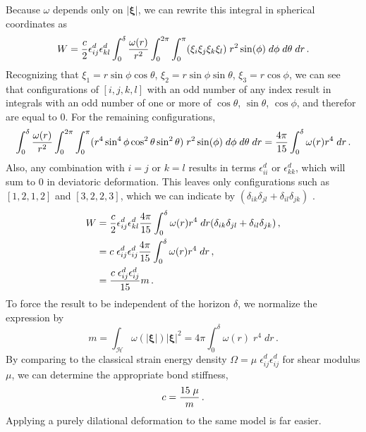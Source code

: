 %
Because $\omega$ depends only on $|\boldsymbol{\xi}|$, we can rewrite this integral in spherical coordinates as
%
\begin{equation}
W= \frac{c}{2}\epsilon_{ij}^d \epsilon_{kl}^d \int_0^\delta \frac{\omega(r)}{r^2}\int_0^{2\pi}\int_0^\pi (\xi_i\xi_j\xi_k\xi_l)\;r^2 \sin(\phi)\;d\phi\;d\theta\;dr\, .\notag
\end{equation}
%
Recognizing that $\xi_1 = r \sin\phi\cos\theta$, $\xi_2=r\sin\phi\sin\theta$, $\xi_3=r\cos\phi$, we can see that configurations of $[i,j,k,l]$ with an odd number of any index result in integrals with an odd number of one or more of $\cos\theta$, $\sin\theta$, $\cos\phi$, and therefor are equal to 0. 
For the remaining configurations,
%
\begin{equation}
\int_0^\delta \frac{\omega(r)}{r^2}\int_0^{2\pi}\int_0^\pi (r^4 \sin^4 \phi \cos^2\theta\sin^2\theta)\;r^2 \sin(\phi)\;d\phi\;d\theta\;dr =  \frac{4\pi}{15} \int_0^\delta \omega(r)r^4\;dr\, .\notag
\end{equation}
%
Also, any combination with $i=j$ or $k=l$ results in terms $\epsilon_{ii}^d$ or  $\epsilon_{kk}^d$, which will sum to 0 in deviatoric deformation. 
This leaves only configurations such as $[1,2,1,2]$ and $[3,2,2,3]$, which we can indicate by $(\delta_{ik}\delta_{jl}+\delta_{il}\delta_{jk})$ .
%
\begin{align}
W&= \frac{c}{2}\epsilon_{ij}^d \epsilon_{kl}^d \frac{4\pi}{15} \int_0^\delta \omega(r)r^4\;dr (\delta_{ik}\delta_{jl}+\delta_{il}\delta_{jk})\, ,\notag\\
&= c \;\epsilon_{ij}^d\epsilon_{ij}^d \frac{4\pi}{15} \int_0^\delta \omega(r)r^4\;dr\, , \notag\\
&= \frac{c\; \epsilon_{ij}^d\epsilon_{ij}^d }{15}m\, .\notag
\end{align}
%
To force the result to be independent of the horizon $\delta$, we normalize the expression by
%
\begin{equation}
\label{eq:weighted}
m=\int_\mathcal{H}\omega(|\boldsymbol{\xi}|)|\boldsymbol{\xi}|^2 = 4\pi \int_0^\delta \omega(r)\;r^4\;dr\, .
\end{equation}
%
By comparing to the classical strain energy density $\Omega = \mu\;\epsilon_{ij}^d\epsilon_{ij}^d$ for shear modulus $\mu$, we can determine the appropriate bond stiffness,
%
\begin{equation}
c = \frac{15\;\mu}{m}\, .\notag
\end{equation}
%
Applying a purely dilational deformation to the same model is far easier.
